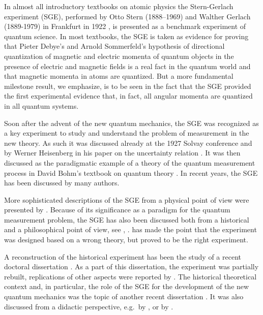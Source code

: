 \documentclass{article}
\begin{document}
In almost all introductory textbooks on atomic physics the Stern-Gerlach experiment (SGE), performed by Otto Stern (1888--1969) and Walther Gerlach (1889-1979) in Frankfurt in 1922 
\citep{SternO1920Messung,GerlachWEtal1921Nachweis,GerlachWEtal1922Nachweis,GerlachWEtal1924Richtungsquantelung,GerlachW1925Richtungsquantelung}, is presented as a benchmark experiment of quantum science. In most textbooks, the SGE is taken as evidence for proving that Pieter Debye's \citep{DebyeP1916Quantenhypothese} and Arnold Sommerfeld's \citep{SommerfeldA1916Theorie} hypothesis of directional quantization of magnetic and electric momenta of quantum objects in the presence of electric and magnetic fields is a real fact in the quantum world and that magnetic momenta in atoms are quantized. But a more fundamental milestone result, we emphasize, is to be seen in the fact that the SGE provided the first experimental  evidence that, in fact, all angular momenta are quantized in all quantum systems. 

Soon after the advent of the new quantum mechanics, the SGE was recognized as a key experiment to study and understand the problem of measurement in the new theory. As such it was discussed already at the 1927 Solvay conference \cite[esp.~pp.~436, 478]{BacciagaluppiGEtAl2009Crossroads} and by Werner Heisenberg in his paper on the uncertainty relation \citep{HeisenbergW1927Inhalt}. It was then discussed as the paradigmatic example of a theory of the quantum measurement process in David Bohm's textbook on quantum theory \cite[ch.~22]{BohmD1951Quantum}. In recent years, the SGE has been discussed by many authors.

More sophisticated descriptions of the SGE from a physical point of view were presented by \cite{ScullyMOEtal1978Reduction,MackintoshAR1983Experiment,ScullyMOEtal1987Theory,ReinischG1999Experiment}.
Because of its significance as a paradigm for the quantum measurement problem, the SGE has also been discussed both from a historical and a philosophical point of view, see \citep{BernsteinJ2010Experiment}, \citep{SauerT2016Perspectives}. \cite{WeinertF1995Theory} has made the point that the experiment was designed based on a wrong theory, but proved to be the right experiment.

A reconstruction of the historical experiment has been the study of a recent doctoral dissertation \citep{TrageserW2011Effekt}. As a part of this dissertation, the experiment was partially rebuilt, replications of other aspects were reported by \cite{FriedrichBEtal2003Stern,FriedrichBEtal2005Stern}. The historical theoretical context and, in particular, the role of the SGE for the development of the new quantum mechanics was the topic of another recent dissertation \citep{Pie2015Experiment}. It was also discussed from a didactic perspective, e.g.\ by \cite{FrenchAPEtal1978Introduction}, or by \cite{PlattD1992Analysis}.
\end{document}
